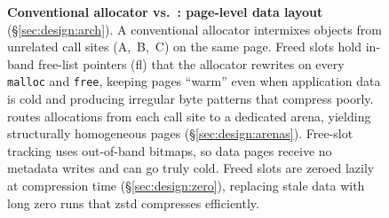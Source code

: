 \begin{figure}[t!]
\caption{\textbf{Conventional allocator vs.\ \sys: page-level data layout}
  (\S\ref{sec:design:arch}).
  A conventional allocator intermixes objects from unrelated call sites
  (A,~B,~C) on the same page.  Freed slots hold in-band free-list
  pointers (\textsf{fl}) that the allocator rewrites on every
  \texttt{malloc} and \texttt{free}, keeping pages ``warm'' even when
  application data is cold and producing irregular byte patterns that
  compress poorly.
  \sys routes allocations from each call site to a dedicated arena,
  yielding structurally homogeneous pages
  (\S\ref{sec:design:arenas}).  Free-slot tracking uses out-of-band
  bitmaps, so data pages receive no metadata writes and can go truly
  cold.  Freed slots are zeroed lazily at compression time
  (\S\ref{sec:design:zero}), replacing stale data with long zero runs
  that zstd compresses efficiently.}
\label{fig:heap_org}
\end{figure}
